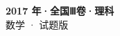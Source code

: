 \documentclass[zihao=-4, a4paper]{ctexart}
\begin{document}
\begin{center}
  {\Large\bfseries 2017 年·全国Ⅲ卷·理科}\\[4pt]
  {\large 数学 · 试题版}
\end{center}
\medskip
{}

\end{document}
